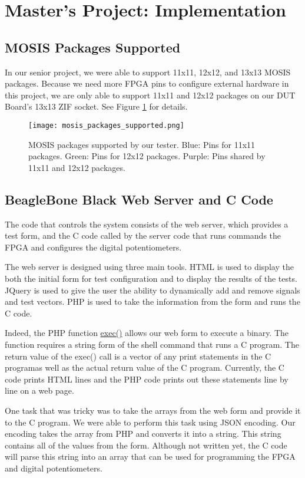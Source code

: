 \section{Master's Project: Implementation}

\subsection{MOSIS Packages Supported}
In our senior project, we were able to support 11x11, 12x12, and 13x13 MOSIS packages. Because we need more FPGA pins to configure external hardware in this project, we are only able to support 11x11 and 12x12 packages on our DUT Board's 13x13 ZIF socket. See Figure \ref{fig:mosis_packages_supported} for details.

\begin{figure}
\texttt{[image: mosis\_packages\_supported.png]}
\caption{MOSIS packages supported by our tester. Blue: Pins for 11x11 packages. Green: Pins for 12x12 packages. Purple: Pins shared by 11x11 and 12x12 packages.}
\label{fig:mosis_packages_supported}
\end{figure}

\subsection{BeagleBone Black Web Server and C Code}
The code that controls the system consists of the web server, which provides a test form, and the C code called by the server code that runs commands the FPGA and configures the digital potentiometers. 

The web server is designed using three main tools. HTML is used to display the both the initial form for test configuration and to display the results of the tests. JQuery is used to give the user the ability to dynamically add and remove signals and test vectors. PHP is used to take the information from the form and runs the C code. 

Indeed, the PHP function \href{http://php.net/manual/en/function.exec.php}{exec()} allows our web form to execute a binary. The function requires a string form of the shell command that runs a C program. The return value of the exec() call is a vector of any print statements in the C programas well as the actual return value of the C program. Currently, the C code prints HTML lines and the PHP code prints out these statements line by line on a web page.

One task that was tricky was to take the arrays from the web form and provide it to the C program. We were able to perform this task using JSON encoding. Our encoding takes the array from PHP and converts it into a string. This string contains all of the values from the form. Although not written yet, the C code will  parse this string into an array that can be used for programming the FPGA and digital potentiometers.

